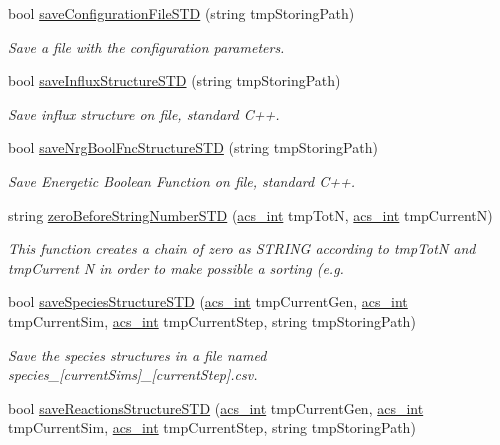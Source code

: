 \begin{DoxyCompactItemize}
bool \hyperlink{a00003_a71f4c5ff1c11a9d61cbc818682a4a91e}{save\-Configuration\-File\-S\-T\-D} (string tmp\-Storing\-Path)
\begin{DoxyCompactList}\small\item\em Save a file with the configuration parameters. \end{DoxyCompactList}\item 
bool \hyperlink{a00003_a8f831e2db11fa5d840484345dac64fc7}{save\-Influx\-Structure\-S\-T\-D} (string tmp\-Storing\-Path)
\begin{DoxyCompactList}\small\item\em Save influx structure on file, standard C++. \end{DoxyCompactList}\item 
bool \hyperlink{a00003_a1412b9b1c3bd3e42bcb481f5e18ea931}{save\-Nrg\-Bool\-Fnc\-Structure\-S\-T\-D} (string tmp\-Storing\-Path)
\begin{DoxyCompactList}\small\item\em Save Energetic Boolean Function on file, standard C++. \end{DoxyCompactList}\item 
string \hyperlink{a00003_a8699a0f85f5e8dc23eb8f78fa22c6b17}{zero\-Before\-String\-Number\-S\-T\-D} (\hyperlink{a00016_a8d277355641a098190360234e2ebde35}{acs\-\_\-int} tmp\-Tot\-N, \hyperlink{a00016_a8d277355641a098190360234e2ebde35}{acs\-\_\-int} tmp\-Current\-N)
\begin{DoxyCompactList}\small\item\em This function creates a chain of zero as S\-T\-R\-I\-N\-G according to tmp\-Tot\-N and tmp\-Current N in order to make possible a sorting (e.\-g. \end{DoxyCompactList}\item 
bool \hyperlink{a00003_a9daeb4f255100b8ad59de9ea80b19b5b}{save\-Species\-Structure\-S\-T\-D} (\hyperlink{a00016_a8d277355641a098190360234e2ebde35}{acs\-\_\-int} tmp\-Current\-Gen, \hyperlink{a00016_a8d277355641a098190360234e2ebde35}{acs\-\_\-int} tmp\-Current\-Sim, \hyperlink{a00016_a8d277355641a098190360234e2ebde35}{acs\-\_\-int} tmp\-Current\-Step, string tmp\-Storing\-Path)
\begin{DoxyCompactList}\small\item\em Save the species structures in a file named species\-\_\-\mbox{[}current\-Sims\mbox{]}\-\_\-\mbox{[}current\-Step\mbox{]}.csv. \end{DoxyCompactList}\item 
bool \hyperlink{a00003_ad381c4ce24045d504539bb7c74800739}{save\-Reactions\-Structure\-S\-T\-D} (\hyperlink{a00016_a8d277355641a098190360234e2ebde35}{acs\-\_\-int} tmp\-Current\-Gen, \hyperlink{a00016_a8d277355641a098190360234e2ebde35}{acs\-\_\-int} tmp\-Current\-Sim, \hyperlink{a00016_a8d277355641a098190360234e2ebde35}{acs\-\_\-int} tmp\-Current\-Step, string tmp\-Storing\-Path)

\end{DoxyCompactItemize}
